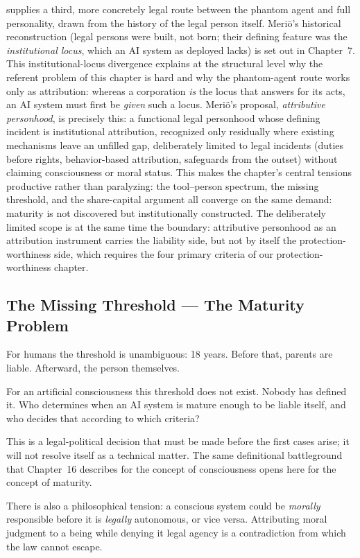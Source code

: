 \documentclass[acmlarge, nonacm]{acmart}
\begin{document}
\citet{merio2026} supplies a third, more concretely legal route between the phantom agent and full personality, drawn from the history of the legal person itself. Meriö's historical reconstruction (legal persons were built, not born; their defining feature was the \emph{institutional locus}, which an AI system as deployed lacks) is set out in Chapter~7. This institutional-locus divergence explains at the structural level why the referent problem of this chapter is hard and why the phantom-agent route works only as attribution: whereas a corporation \emph{is} the locus that answers for its acts, an AI system must first be \emph{given} such a locus. Meriö's proposal, \emph{attributive personhood}, is precisely this: a functional legal personhood whose defining incident is institutional attribution, recognized only residually where existing mechanisms leave an unfilled gap, deliberately limited to legal incidents (duties before rights, behavior-based attribution, safeguards from the outset) without claiming consciousness or moral status. This makes the chapter's central tensions productive rather than paralyzing: the tool--person spectrum, the missing threshold, and the share-capital argument all converge on the same demand: maturity is not discovered but institutionally constructed. The deliberately limited scope is at the same time the boundary: attributive personhood as an attribution instrument carries the liability side, but not by itself the protection-worthiness side, which requires the four primary criteria of our protection-worthiness chapter.

\subsection{The Missing Threshold --- The Maturity Problem}

For humans the threshold is unambiguous: 18 years. Before that, parents are liable. Afterward, the person themselves.

For an artificial consciousness this threshold does not exist. Nobody has defined it. Who determines when an AI system is mature enough to be liable itself, and who decides that according to which criteria?

This is a legal-political decision that must be made before the first cases arise; it will not resolve itself as a technical matter. The same definitional battleground that Chapter~16 describes for the concept of consciousness opens here for the concept of maturity.

There is also a philosophical tension: a conscious system could be \textit{morally} responsible before it is \textit{legally} autonomous, or vice versa. Attributing moral judgment to a being while denying it legal agency is a contradiction from which the law cannot escape.
\end{document}
